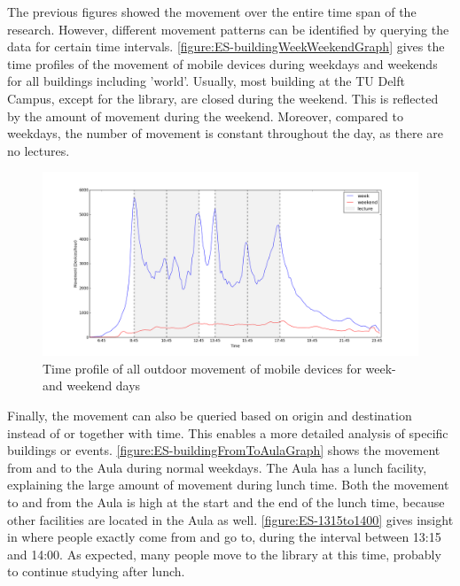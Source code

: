 The previous figures showed the movement over the entire time span of the research. However, different movement patterns can be identified by querying the data for certain time intervals. \autoref{figure:ES-buildingWeekWeekendGraph} gives the time profiles of the movement of mobile devices during weekdays and weekends for all buildings including 'world'. Usually, most building at the TU Delft Campus, except for the library, are closed during the weekend. This is reflected by the amount of movement during the weekend. Moreover, compared to weekdays, the number of movement is constant throughout the day, as there are no lectures.

\begin{figure}[H]
\centering
\includegraphics[scale=0.2]{building_weekWeekend_graph.png}
\captionsetup{justification=centering}
\caption{Time profile of all outdoor movement of mobile devices for week- and weekend days}
\label{figure:ES-buildingWeekWeekendGraph}
\end{figure}

Finally, the movement can also be queried based on origin and destination instead of or together with time. This enables a more detailed analysis of specific buildings or events. \autoref{figure:ES-buildingFromToAulaGraph} shows the movement from and to the Aula during normal weekdays. The Aula has a lunch facility, explaining the large amount of movement during lunch time. Both the movement to and from the Aula is high at the start and the end of the lunch time, because other facilities are located in the Aula as well. \autoref{figure:ES-1315to1400} gives insight in where people exactly come from and go to, during the interval between 13:15 and 14:00. As expected, many people move to the library at this time, probably to continue studying after lunch. 

